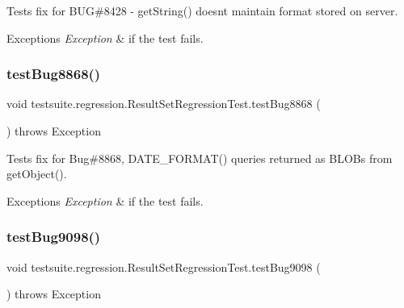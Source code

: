Tests fix for B\+UG\#8428 -\/ get\+String() doesn\textquotesingle{}t maintain format stored on server.


\begin{DoxyExceptions}{Exceptions}
{\em Exception} & if the test fails. \\
\hline
\end{DoxyExceptions}
\mbox{\label{classtestsuite_1_1regression_1_1_result_set_regression_test_a2d7ec45736b6d8ba77d988e4dae8c5a0}} 
\subsubsection{\texorpdfstring{test\+Bug8868()}{testBug8868()}}
{\footnotesize\ttfamily void testsuite.\+regression.\+Result\+Set\+Regression\+Test.\+test\+Bug8868 (\begin{DoxyParamCaption}{ }\end{DoxyParamCaption}) throws Exception}

Tests fix for Bug\#8868, D\+A\+T\+E\+\_\+\+F\+O\+R\+M\+A\+T() queries returned as B\+L\+O\+Bs from get\+Object().


\begin{DoxyExceptions}{Exceptions}
{\em Exception} & if the test fails. \\
\hline
\end{DoxyExceptions}
\mbox{\label{classtestsuite_1_1regression_1_1_result_set_regression_test_a73f559230b24a5776a1ce47569f3f82a}} 
\subsubsection{\texorpdfstring{test\+Bug9098()}{testBug9098()}}
{\footnotesize\ttfamily void testsuite.\+regression.\+Result\+Set\+Regression\+Test.\+test\+Bug9098 (\begin{DoxyParamCaption}{ }\end{DoxyParamCaption}) throws Exception}


